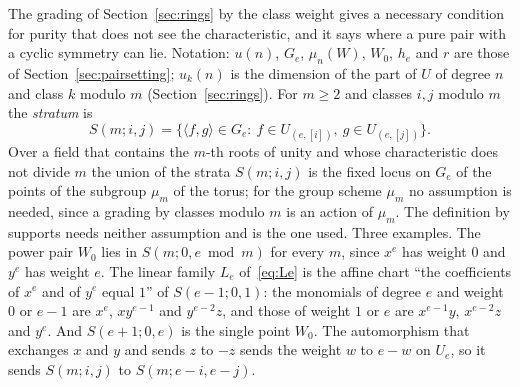 \documentclass[11pt]{article}
\theoremstyle{definition}
\theoremstyle{remark}
\begin{document}
The grading of Section~\ref{sec:rings} by the class weight gives a necessary condition for purity that does not see the characteristic, and it says where a pure pair with a cyclic symmetry can lie. Notation: $u(n)$, $G_e$, $\mu_n(W)$, $W_0$, $h_e$ and $r$ are those of Section~\ref{sec:pairsetting}; $u_k(n)$ is the dimension of the part of $U$ of degree $n$ and class $k$ modulo $m$ (Section~\ref{sec:rings}). For $m\ge2$ and classes $i,j$ modulo $m$ the \emph{stratum} is
\begin{equation}\label{eq:stratum}
S(m;i,j)=\{\langle f,g\rangle\in G_e:\ f\in U_{(e,[i])},\ g\in U_{(e,[j])}\}.
\end{equation}
Over a field that contains the $m$-th roots of unity and whose characteristic does not divide $m$ the union of the strata $S(m;i,j)$ is the fixed locus on $G_e$ of the points of the subgroup $\mu_m$ of the torus; for the group scheme $\mu_m$ no assumption is needed, since a grading by classes modulo $m$ is an action of $\mu_m$. The definition by supports needs neither assumption and is the one used. Three examples. The power pair $W_0$ lies in $S(m;0,e\bmod m)$ for every $m$, since $x^e$ has weight $0$ and $y^e$ has weight $e$. The linear family $L_e$ of~\eqref{eq:Le} is the affine chart ``the coefficients of $x^e$ and of $y^e$ equal $1$'' of $S(e-1;0,1)$: the monomials of degree $e$ and weight $0$ or $e-1$ are $x^e$, $xy^{e-1}$ and $y^{e-2}z$, and those of weight $1$ or $e$ are $x^{e-1}y$, $x^{e-2}z$ and $y^e$. And $S(e+1;0,e)$ is the single point $W_0$. The automorphism that exchanges $x$ and $y$ and sends $z$ to $-z$ sends the weight $w$ to $e-w$ on $U_e$, so it sends $S(m;i,j)$ to $S(m;e-i,e-j)$.
\end{document}
